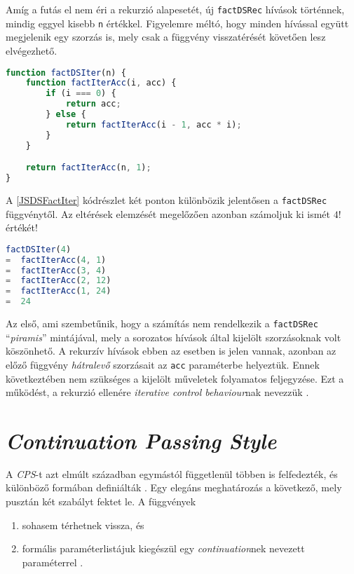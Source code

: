 Amíg a futás el nem éri a rekurzió alapesetét, új \texttt{factDSRec} hívások történnek, mindig eggyel kisebb \texttt{n} értékkel. Figyelemre méltó, hogy minden hívással együtt megjelenik egy szorzás is, mely csak a függvény visszatérését követően lesz elvégezhető.

\begin{lstlisting}[language=JavaScript, caption={\textit{Direct style} faktoriálist meghatározó függvény akkumulátorral}, captionpos=b, label=JSDSFactIter]
function factDSIter(n) {
    function factIterAcc(i, acc) {
        if (i === 0) {
            return acc;
        } else {
            return factIterAcc(i - 1, acc * i);
        }
    }

    return factIterAcc(n, 1);
}
\end{lstlisting}

A \ref{JSDSFactIter} kódrészlet két ponton különbözik jelentősen a \texttt{factDSRec} függvénytől. Az eltérések elemzését megelőzően azonban számoljuk ki ismét $4!$ értékét!

\begin{lstlisting}[language=JavaScript, caption={$4!$ kiszámítása \texttt{factDSIter} segítségével}, captionpos=b, numbers=none]
   factDSIter(4)
=  factIterAcc(4, 1)
=  factIterAcc(3, 4)
=  factIterAcc(2, 12)
=  factIterAcc(1, 24)
=  24
\end{lstlisting}

Az első, ami szembetűnik, hogy a számítás nem rendelkezik a \texttt{factDSRec} ``\textit{piramis}'' mintájával, mely a sorozatos hívások által kijelölt szorzásoknak volt köszönhető. A rekurzív hívások ebben az esetben is jelen vannak, azonban az előző függvény \textit{hátralevő} szorzásait az \texttt{acc} paraméterbe helyeztük. Ennek következtében nem szükséges a kijelölt műveletek folyamatos feljegyzése. Ezt a működést, a rekurzió ellenére \textit{iterative control behaviour}nak nevezzük .

\section{\textit{Continuation Passing Style}}

A \textit{CPS}-t azt elmúlt században egymástól függetlenül többen is felfedezték, és különböző formában definiálták \cite{Reynolds1993}. Egy elegáns meghatározás a következő, mely pusztán két szabályt fektet le. A függvények

\begin{enumerate}
    \item sohasem térhetnek vissza, és
    \item formális paraméterlistájuk kiegészül egy \textit{continuation}nek nevezett paraméterrel \cite{MightCPS}.
\end{enumerate}

